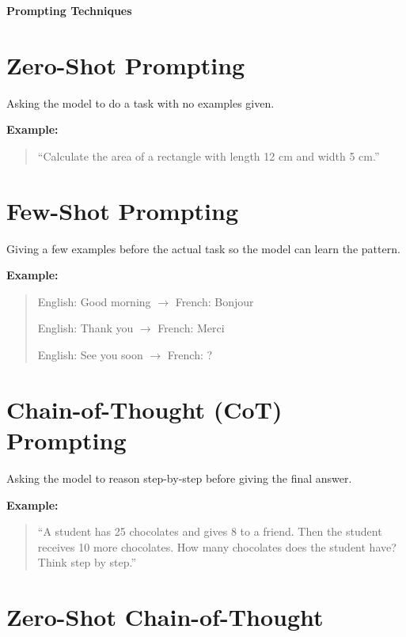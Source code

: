 \documentclass[12pt]{article}
\begin{document}
\begin{center}
    {\LARGE \textbf{Prompting Techniques}}
\end{center}

\vspace{8pt}

\section{Zero-Shot Prompting}

Asking the model to do a task with no examples given.

\textbf{Example:}

\begin{quote}
``Calculate the area of a rectangle with length 12 cm and width 5 cm.''
\end{quote}


\section{Few-Shot Prompting}

Giving a few examples before the actual task so the model can learn the pattern.

\textbf{Example:}

\begin{quote}
English: Good morning $\rightarrow$ French: Bonjour

English: Thank you $\rightarrow$ French: Merci

English: See you soon $\rightarrow$ French: ?
\end{quote}


\section{Chain-of-Thought (CoT) Prompting}

Asking the model to reason step-by-step before giving the final answer.

\textbf{Example:}

\begin{quote}
``A student has 25 chocolates and gives 8 to a friend. Then the student receives 10 more chocolates. How many chocolates does the student have? Think step by step.''
\end{quote}


\section{Zero-Shot Chain-of-Thought}
\end{document}

